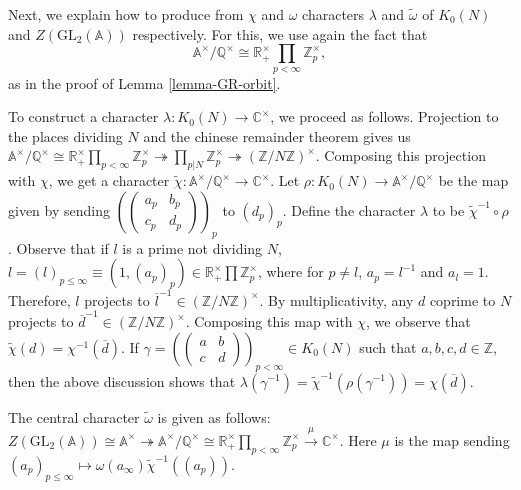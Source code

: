Next, we explain how to produce from $\chi$ and $\omega$ characters $\lambda$ and $\tilde{\omega}$ of $K_{0}(N)$ and $Z(\text{GL}_2(\mathbb{A}))$ respectively. For this, we use again the fact that 	
$$\mathbb{A}^{\times}/\mathbb{Q}^{\times} \cong  \mathbb{R}^{\times}_{+} \prod_{p < \infty} \mathbb{Z}_{p}^{\times},$$
as in the proof of Lemma \ref{lemma-GR-orbit}.


To construct a character $\lambda: K_{0}(N) \to \mathbb{C}^{\times}$, we proceed as follows. Projection to the places dividing $N$ and the chinese remainder theorem gives us $ \mathbb{A}^{\times}/\mathbb{Q}^{\times} \cong  \mathbb{R}^{\times}_{+} \prod_{p < \infty} \mathbb{Z}_{p}^{\times} \twoheadrightarrow \prod_{p|N} \mathbb{Z}_{p}^{\times} \twoheadrightarrow (\mathbb{Z}/N\mathbb{Z})^{\times}$. Composing this projection with $\chi$, we get a character $\tilde{\chi}: \mathbb{A}^{\times}/\mathbb{Q}^{\times} \to \mathbb{C}^{\times}$. 
Let $\rho: K_{0}(N) \to \mathbb{A}^{\times}/\mathbb{Q}^{\times}$ be the map given by sending $(\begin{pmatrix} a_{p} & b_{p} \\ c_{p} & d_{p} \end{pmatrix})_{p}$ to $(d_p)_p$. Define the character $\lambda$ to be $\tilde{\chi}^{-1} \circ \rho$. Observe that if $l$ is a prime not dividing $N$, $l = (l)_{p \leq \infty} \equiv (1, (a_p)_p) \in  \mathbb{R}^{\times}_{+} \prod \mathbb{Z}_{p}^{\times}$, where for $p \neq l$, $a_p = l^{-1}$ and $a_l = 1$. Therefore, $l$ projects to $\overline{l}^{-1} \in (\mathbb{Z}/N\mathbb{Z})^{\times}$. By multiplicativity, any $d$ coprime to $N$ projects to $\overline{d}^{-1} \in (\mathbb{Z}/N\mathbb{Z})^{\times}$. Composing this map with $\chi$, we observe that $\tilde{\chi}(d) = \chi^{-1}(\overline{d})$. If $\gamma = (\begin{pmatrix} a & b \\ c & d \end{pmatrix})_{p<\infty} \in K_{0}(N)$ such that $a, b, c, d \in \mathbb{Z}$, then the above discussion shows that $\lambda(\gamma^{-1}) = \tilde{\chi}^{-1} (\rho(\gamma^{-1})) = \chi(\overline{d})$.

The central character $\tilde{\omega}$ is given as follows:
$Z(\text{GL}_{2}(\mathbb{A})) \cong \mathbb{A}^{\times} \twoheadrightarrow \mathbb{A}^{\times}/\mathbb{Q}^{\times} \cong \mathbb{R}^{\times}_{+} \prod_{p < \infty} \mathbb{Z}_{p}^{\times} \overset{\mu}\rightarrow \mathbb{C}^{\times}$. Here $\mu$ is the map sending $(a_p)_{p \leq \infty} \mapsto \omega(a_{\infty}) \tilde{\chi}^{-1}((a_p))$.

